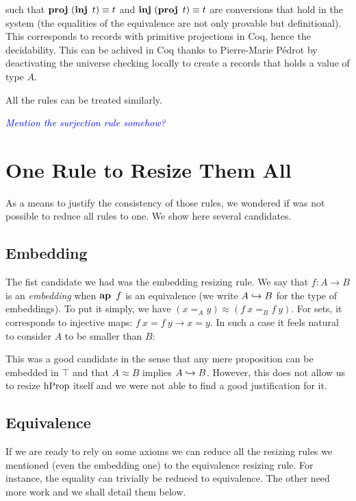 \documentclass[11pt]{article}
\theoremstyle{plain}
\theoremstyle{remark}
\newcommand\meta[1]{\noindent\textcolor{blue}{\emph{#1}}}
\begin{document}
\begin{mathc}
  \qquad
\end{mathc}
%
\noindent
such that $\operatorname{\mathbf{proj}}\ (\operatorname{\mathbf{inj}}\ t) \equiv t$ and $\operatorname{\mathbf{inj}}\ (\operatorname{\mathbf{proj}}\ t) \equiv t$ are
conversions that hold in the system (the equalities of the equivalence are not
only provable but definitional).
This corresponds to records with primitive projections in Coq, hence the
decidability.
%
This can be achived in Coq thanks to Pierre-Marie Pédrot by deactivating the
universe checking locally to create a records that holds a value of type $A$.

All the rules can be treated similarly.

\meta{Mention the surjection rule somehow?}


\section{One Rule to Resize Them All}

As a means to justify the consistency of those rules, we wondered if was not
possible to reduce all rules to one. We show here several candidates.

\subsection{Embedding}
The fist candidate we had was the embedding resizing rule.
We say that $f : A \to B$  is an \emph{embedding} when $\operatorname{\mathbf{ap}}\ f$ is an
equivalence (we write $A \hookrightarrow B$ for the type of embeddings).
To put it simply, we have $(x =_A y) \approx (f\ x =_B f\ y)$.
For sets, it corresponds to injective maps:
$f\ x = f\ y \to x = y$.
In such a case it feels natural to consider $A$ to be smaller than $B$:

\begin{mathc}
\end{mathc}

\noindent
This was a good candidate in the sense that any mere proposition can be embedded
in $\top$ and that $A \approx B$ implies $A \hookrightarrow B$.
However, this does not allow us to resize $\operatorname{hProp}$ itself and we were not able
to find a good justification for it.

\subsection{Equivalence}
If we are ready to rely on some axioms we can reduce all the resizing rules we
mentioned (even the embedding one) to the equivalence resizing rule.
For instance, the equality can trivially be reduced to equivalence.
The other need more work and we shall detail them below.
\end{document}
